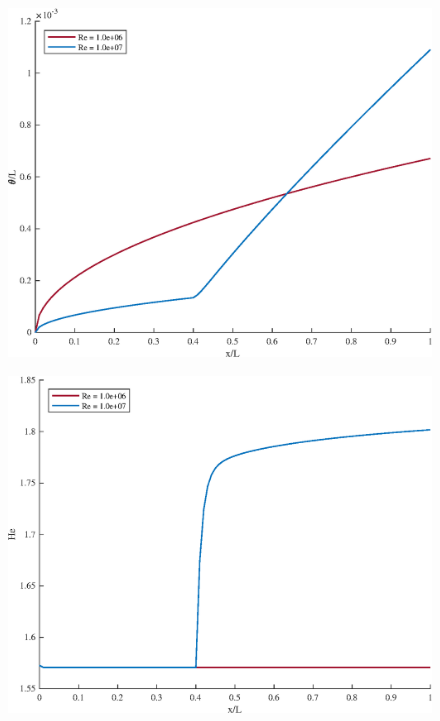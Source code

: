 


\begin{figure}[H]
\centering
\includegraphics[scale=0.53]{graphs/e6g1.eps}
\caption{}
\label{e6g1}
\end{figure}

\begin{figure}[H]
\centering
\includegraphics[scale=0.53]{graphs/e6g2.eps}
\caption{}
\label{e6g2}
\end{figure}

